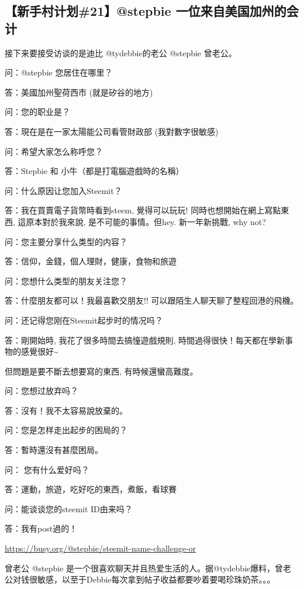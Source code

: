 \documentclass[]{ctexbook}
\begin{document}
\hypertarget{21stepbie-}{%
\subsection{【新手村计划\#21】@stepbie 一位来自美国加州的会计}\label{21stepbie-}}

接下来要接受访谈的是迪比 @tydebbie的老公 @stepbie 曾老公。

问：@stepbie 您居住在哪里？

答：美國加州聖荷西市 (就是矽谷的地方)

问：您的职业是？

答：現在是在一家太陽能公司看管財政部 (我對數字很敏感)

问：希望大家怎么称呼您？

答：Stepbie 和 小牛（都是打電腦遊戲時的名稱）

问：什么原因让您加入Steemit？

答：我在買賣電子貨幣時看到steem, 覺得可以玩玩! 同時也想開始在網上寫點東西, 這原本對於我來說, 是不可能的事情。但hey. 新一年新挑戰, why not?

问：您主要分享什么类型的内容？

答：信仰，金錢，個人理財，健康，食物和旅遊

问：您想什么类型的朋友关注您？

答：什麼朋友都可以！我最喜歡交朋友!! 可以跟陌生人聊天聊了整程回港的飛機。

问：还记得您刚在Steemit起步时的情况吗？

答：剛開始時, 我花了很多時間去搞憧遊戲規則, 時間過得很快！每天都在學新事物的感覺很好\textasciitilde{}

但問題是要不斷去想要寫的東西, 有時候還蠻高難度。

问：您想过放弃吗？

答：沒有！我不太容易說放棄的。

问：您是怎样走出起步的困局的？

答：暫時還沒有甚麼困局。

问： 您有什么爱好吗？

答：運動，旅遊，吃好吃的東西，煮飯，看球賽

问：能谈谈您的steemit ID由来吗？

答：我有post過的！

\url{https://busy.org/@stepbie/steemit-name-challenge-or}

曾老公 @stepbie 是一个很喜欢聊天并且热爱生活的人。据@tydebbie爆料，曾老公对钱很敏感，以至于Debbie每次拿到帖子收益都要吵着要喝珍珠奶茶。。。
\end{document}

